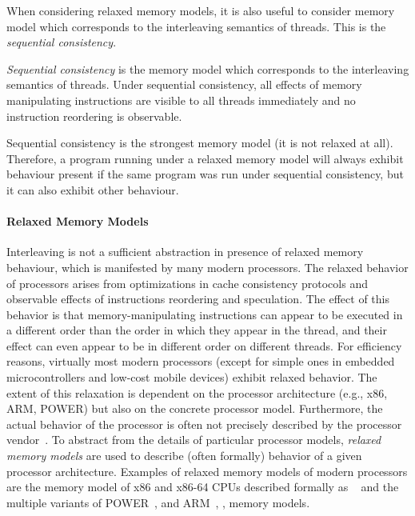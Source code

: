 When considering relaxed memory models, it is also useful to consider memory
model which corresponds to the interleaving semantics of threads.
This is the \emph{sequential consistency}.

\begin{definition}
    \emph{Sequential consistency} is the memory model which corresponds to the
    interleaving semantics of threads.
    Under sequential consistency, all effects of memory manipulating
    instructions are visible to all threads immediately and no instruction
    reordering is observable.
\end{definition}

Sequential consistency is the strongest memory model (it is not relaxed at all).
Therefore, a program running under a relaxed memory model will always exhibit
behaviour present if the same program was run under sequential consistency, but
it can also exhibit other behaviour.

\paragraph{Relaxed Memory Models}

Interleaving is not a sufficient abstraction in presence of relaxed memory
behaviour, which is manifested by many modern processors.
The relaxed behavior of processors arises from optimizations in cache
consistency protocols and observable effects of instructions reordering and
speculation.
The effect of this behavior is that memory-manipulating instructions can appear
to be executed in a different order than the order in which they appear in the
thread, and their effect can even appear to be in different order on different
threads.
For efficiency reasons, virtually most modern processors (except for simple
ones in embedded microcontrollers and low-cost mobile devices) exhibit relaxed
behavior.
The extent of this relaxation is dependent on the processor architecture (e.g.,
x86, ARM, POWER) but also on the concrete processor model.
Furthermore, the actual behavior of the processor is often not precisely
described by the processor vendor~.
To abstract from the details of particular processor models, \emph{relaxed
memory models} are used to describe (often formally) behavior of a given
processor architecture.
Examples of relaxed memory models of modern processors are the memory model of
x86 and x86-64 CPUs described formally as \xtso~ and the multiple
variants of POWER~, and
ARM~, ,  memory models.

